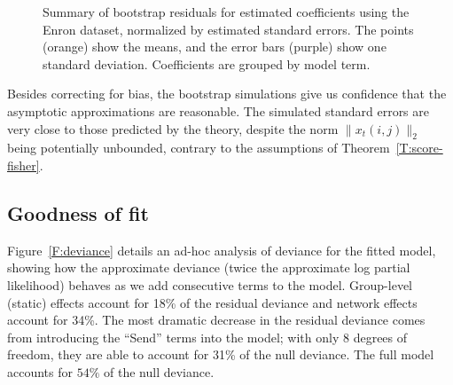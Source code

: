 \documentclass[final]{statsoc}
\begin{document}
\begin{figure}
    \centering
    \caption{
        Summary of bootstrap residuals
        for estimated coefficients using the Enron dataset, normalized by
        estimated standard errors.  The points (orange) show the means, and
        the error bars (purple) show one standard deviation.  Coefficients
        are grouped by model term.
    }
    \label{F:boot-resid}
\end{figure}

Besides correcting for bias, the bootstrap simulations give us confidence that
the asymptotic approximations are reasonable.  The simulated standard errors
are very close to those predicted by the theory, despite the norm $\| x_t(i,j)
\|_2$ being potentially unbounded, contrary to the assumptions of
Theorem~\ref{T:score-fisher}.


\subsection{Goodness of fit}\label{S:enron-goodness}

Figure~\ref{F:deviance} details an ad-hoc analysis of deviance for the
fitted model, showing how the approximate deviance (twice the approximate
log partial likelihood) behaves as we add consecutive terms to the model.
Group-level (static) effects account for 18\% of the residual deviance and
network effects account for 34\%.  The most dramatic decrease in the residual
deviance comes from introducing the ``Send'' terms into the model; with only 8
degrees of freedom, they are able to account for 31\% of the null deviance.
The full model accounts for $54\%$ of the null deviance.
\end{document}
